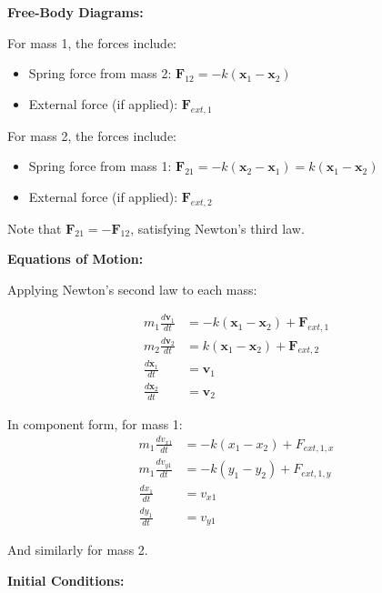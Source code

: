 \documentclass[11pt,a4paper]{article}
\begin{document}
\noindent \textbf{Free-Body Diagrams:}

\noindent For mass 1, the forces include:
\begin{itemize}
    \item Spring force from mass 2: $\mathbf{F}_{12} = -k(\mathbf{x}_1 - \mathbf{x}_2)$
    \item External force (if applied): $\mathbf{F}_{ext,1}$
\end{itemize}

\noindent For mass 2, the forces include:
\begin{itemize}
    \item Spring force from mass 1: $\mathbf{F}_{21} = -k(\mathbf{x}_2 - \mathbf{x}_1) = k(\mathbf{x}_1 - \mathbf{x}_2)$
    \item External force (if applied): $\mathbf{F}_{ext,2}$
\end{itemize}

\noindent Note that $\mathbf{F}_{21} = -\mathbf{F}_{12}$, satisfying Newton's third law. \newline

\noindent \textbf{Equations of Motion:}

\noindent Applying Newton's second law to each mass:

\begin{align}
m_1 \frac{d\mathbf{v}_1}{dt} &= -k(\mathbf{x}_1 - \mathbf{x}_2) + \mathbf{F}_{ext,1} \label{eq:linear_mass1} \\
m_2 \frac{d\mathbf{v}_2}{dt} &= k(\mathbf{x}_1 - \mathbf{x}_2) + \mathbf{F}_{ext,2} \label{eq:linear_mass2} \\
\frac{d\mathbf{x}_1}{dt} &= \mathbf{v}_1 \label{eq:kinematics1} \\
\frac{d\mathbf{x}_2}{dt} &= \mathbf{v}_2 \label{eq:kinematics2}
\end{align}

\noindent In component form, for mass 1:
\begin{align}
m_1 \frac{dv_{x1}}{dt} &= -k(x_1 - x_2) + F_{ext,1,x} \\
m_1 \frac{dv_{y1}}{dt} &= -k(y_1 - y_2) + F_{ext,1,y} \\
\frac{dx_1}{dt} &= v_{x1} \\
\frac{dy_1}{dt} &= v_{y1}
\end{align}

\noindent And similarly for mass 2. \newline

\noindent \textbf{Initial Conditions:}
\end{document}
